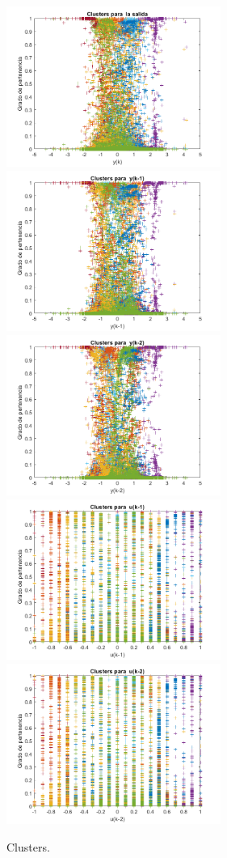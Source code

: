 \documentclass[12pt]{article}
\begin{document}
\begin{figure}
\centering
\caption{Clusters.}
\includegraphics[width=7cm]{imag/ClusterSalida}\\
\includegraphics[width=7cm]{imag/Clustery1}
\includegraphics[width=7cm]{imag/Clustery2}\\
\includegraphics[width=7cm]{imag/Clusteru1}
\includegraphics[width=7cm]{imag/Clusteru2}\\
\label{f_Cluster}
\end{figure}
\end{document}
